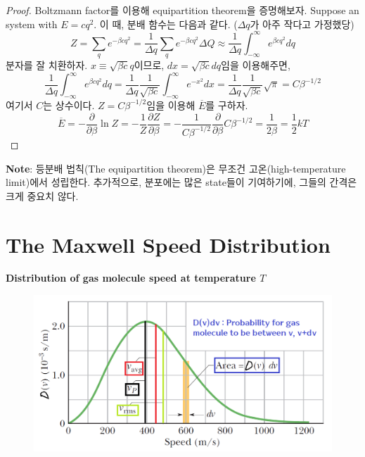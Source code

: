 \documentclass{article}
\begin{document}
\begin{proof}
    Boltzmann factor를 이용해 equipartition theorem을 증명해보자. Suppose an system with $E = cq^2$. 이 때, 분배 함수는 다음과 같다. ($\Delta q$가 아주 작다고 가정했당)
    \begin{equation}
        Z = \sum_q e^{-\beta cq^2 } = \frac{1}{\Delta q} \sum_q e^{-\beta c q^2} \Delta Q \approx \frac{1}{\Delta q} \int_{-\infty}^\infty e^{\beta c q^2} dq
    \end{equation}
    분자를 잘 치환하자. $x \equiv \sqrt{\beta c} q$이므로, $dx = \sqrt{\beta c} dq$임을 이용해주면,
    \begin{equation}
        \frac{1}{\Delta q} \int_{-\infty}^\infty e^{\beta c q^2} dq = \frac{1}{\Delta q} \frac{1}{\sqrt{\beta c}} \int_{-\infty}^{\infty} e^{-x^2} dx = \frac{1}{\Delta q} \frac{1}{\sqrt{\beta c}} \sqrt{\pi} = C \beta^{-1/2}
    \end{equation}
    여기서 $C$는 상수이다. $Z = C\beta^{-1/2}$임을 이용해 $\overline{E}$를 구하자.
    \begin{equation}
        \overline{E} = - \frac{\partial}{\partial \beta} \ln Z = -\frac{1}{Z} \frac{\partial Z}{\partial \beta} = -\frac{1}{C\beta^{-1/2}} \frac{\partial}{\partial \beta} C\beta^{-1/2} = \frac{1}{2\beta} = \frac{1}{2} kT
    \end{equation}
\end{proof}

\noindent
\textbf{Note}: 등분배 법칙(The equipartition theorem)은 무조건 고온(high-temperature limit)에서 성립한다. 추가적으로, 분포에는 많은 state들이 기여하기에, 그들의 간격은 크게 중요치 않다.

\newpage

\section{The Maxwell Speed Distribution}

\noindent
\textbf{Distribution of gas molecule speed at temperature $T$}

\begin{figure}[h]
    \centering
    \includegraphics[width=0.75\linewidth]{images/fig4_1.png}
\end{figure}
\end{document}
